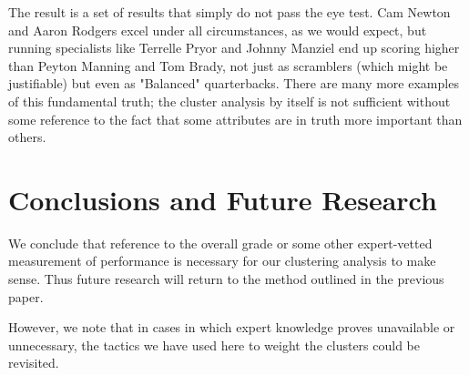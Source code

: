 \documentclass[12pt]{article}
\begin{document}
The result is a set of results that simply do not pass the eye test. Cam Newton and Aaron Rodgers excel under all circumstances, as we would expect, but running specialists like Terrelle Pryor and Johnny Manziel end up scoring higher than Peyton Manning and Tom Brady, not just as scramblers (which might be justifiable) but even as "Balanced" quarterbacks. There are many more examples of this fundamental truth; the cluster analysis by itself is not sufficient without some reference to the fact that some attributes are in truth more important than others.

\section{Conclusions and Future Research}

We conclude that reference to the overall grade or some other expert-vetted measurement of performance is necessary for our clustering analysis to make sense. Thus future research will return to the method outlined in the previous paper. 

However, we note that in cases in which expert knowledge proves unavailable or unnecessary, the tactics we have used here to weight the clusters could be revisited.



\end{document}
